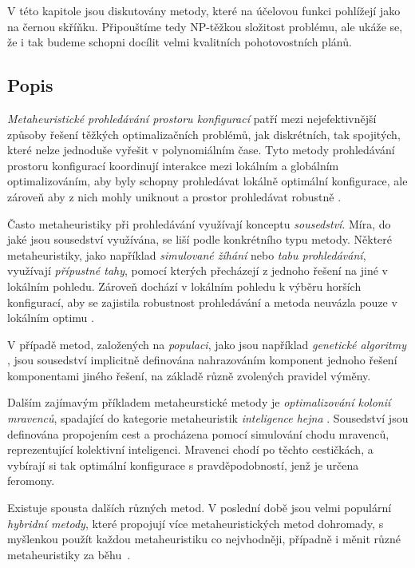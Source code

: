 V této kapitole jsou diskutovány metody, které na účelovou funkci pohlížejí jako na černou skříňku. 
Připouštíme tedy NP-těžkou složitost problému, ale ukáže se, že i tak budeme schopni docílit velmi kvalitních pohotovostních plánů.

\subsection{Popis}

\textit{Metaheuristické prohledávání prostoru konfigurací} patří mezi nejefektivnější způsoby řešení těžkých optimalizačních problémů,
jak diskrétních, tak spojitých,
které nelze jednoduše vyřešit v polynomiálním čase.
Tyto metody prohledávání prostoru konfigurací koordinují interakce mezi lokálním a globálním optimalizováním,
aby byly schopny prohledávat lokálně optimální konfigurace, ale zároveň aby z nich mohly uniknout a prostor prohledávat robustně \cite{GlovKoch03}.

Často metaheuristiky při prohledávání využívají konceptu \textit{sousedství}.
Míra, do jaké jsou sousedství využívána, se liší podle konkrétního typu metody.
Některé metaheuristiky, jako například \textit{simulované žíhání} nebo \textit{tabu prohledávání}, využívají \textit{přípustné tahy},
pomocí kterých přecházejí z jednoho řešení na jiné v lokálním pohledu.
Zároveň dochází v lokálním pohledu k výběru horších konfigurací, aby se zajistila robustnost prohledávání
a metoda neuvázla pouze v lokálním optimu \cite{GlovKoch03}.

V případě metod, založených na \textit{populaci}, jako jsou například \textit{genetické algoritmy} \cite{genetic}, jsou sousedství implicitně definována
nahrazováním komponent jednoho řešení komponentami jiného řešení, na základě různě zvolených pravidel výměny.

Dalším zajímavým příkladem metaheurstické metody je \textit{optimalizování kolonií mravenců}, spadající do kategorie metaheuristik \textit{inteligence hejna} \cite{ACO}.
Sousedství jsou definována propojením cest a procházena pomocí simulování chodu mravenců, reprezentující kolektivní inteligenci.
Mravenci chodí po těchto cestičkách, a vybírají si tak optimální konfigurace s pravděpodobností, jenž je určena feromony.

Existuje spousta dalších různých metod. V poslední době jsou velmi populární \textit{hybridní metody},
které propojují více metaheuristických metod dohromady, s myšlenkou použít každou metaheuristiku co nejvhodněji,
případně i měnit různé metaheuristiky za běhu~\cite{HybridMeta}.

